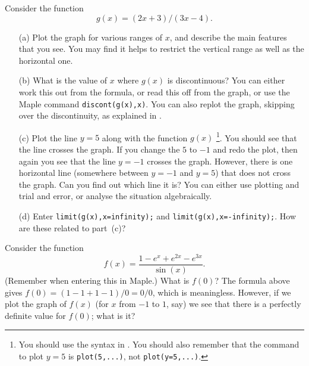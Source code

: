 \documentclass[a4paper,10pt]{amsbook}
\numberwithin{example}{chapter}
\begin{document}
\begin{exercise}\label{ex-mobius}
 Consider the function
 \[ g(x) = (2x+3)/(3x-4). \]
 \begin{itemize}
  \item[(a)]
   Plot the graph for various ranges of $x$, and describe the main
   features that you see.  You may find it helps to restrict the
   vertical range \note{\NOTEvertrange} as well as the horizontal one.
  \item[(b)] What is the value of $x$ where $g(x)$ is discontinuous? 
   You can either work this out from the formula, or read this off
   from the graph, or use the Maple command \verb~discont(g(x),x)~. 
   You can also replot the graph, skipping over the
   discontinuity, as explained in \note{\NOTEdiscont}.
  \item[(c)] 
   Plot the line $y=5$ along with the function $g(x)$  
   \footnote{You should use the syntax in \note{\NOTEtwoplots}.  You
   should also remember that the command to plot $y=5$ is
   \verb~plot(5,...)~, not \verb~plot(y=5,...)~.}. 
   You should see that the line crosses the graph.  If you change the
   $5$ to $-1$ and redo the plot, then again you see that the line
   $y=-1$ crosses the graph.  However, there is one horizontal line
   (somewhere between $y=-1$ and $y=5$) that does not cross the
   graph.  Can you find out which line it is?  You can either use
   plotting and trial and error, or analyse the situation
   algebraically. 
  \item[(d)] Enter \verb~limit(g(x),x=infinity);~ and
   \verb~limit(g(x),x=-infinity);~.  How are these related to
   part~(c)? 
 \end{itemize}
\end{exercise}
        
\begin{exercise}\label{ex-lhopital}
 Consider the function
 \[ f(x) = \frac{1 - e^x + e^{2x} - e^{3x}}{\sin(x)}. \]
 (Remember \note{\NOTEarrow} when entering this in Maple.)
 What is $f(0)$?  The formula above gives $f(0)=(1-1+1-1)/0=0/0$,
 which is meaningless.  However, if we plot the graph of $f(x)$ (for
 $x$ from $-1$ to $1$, say) we see that there is a perfectly definite
 value for $f(0)$; what is it?  
\end{exercise}
\end{document}
